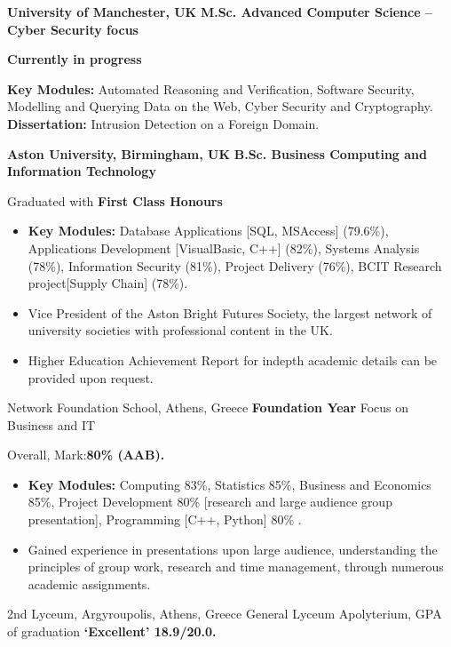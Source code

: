 {\textbf{University of Manchester, UK}}
{\textbf{M.Sc. Advanced Computer Science -- Cyber Security focus}}
{
    \textbf{Currently in progress}

    \textbf{Key Modules:} Automated Reasoning and Verification, Software Security, Modelling and Querying Data on the Web, Cyber Security and Cryptography.
    \\\textbf{Dissertation:} Intrusion Detection on a Foreign Domain.
}

{\textbf{Aston University, Birmingham, UK}}
{\textbf{B.Sc. Business Computing and Information Technology}}
{
    Graduated with \textbf{First Class Honours }
    \begin{itemize}
        \item \textbf{Key Modules:} Database Applications [SQL, MSAccess] (79.6\%), Applications Development [VisualBasic, C++] (82\%), Systems Analysis (78\%), Information Security (81\%), Project Delivery (76\%), BCIT Research project[Supply Chain]  (78\%).
        \item Vice President of the Aston Bright Futures Society, the largest network of university societies with professional content in the UK.
        \item Higher Education Achievement Report for indepth academic details can be provided upon request.
    \end{itemize}
}

{Network Foundation School, Athens, Greece}
{\textbf{Foundation Year} Focus on Business and IT}
{
    Overall, Mark:\textbf{80\% (AAB).}
    \begin{itemize}
        \item \textbf{Key Modules:} Computing 83\%, Statistics 85\%, Business and Economics 85\%, Project Development 80\% [research and large audience group presentation], Programming [C++, Python] 80\% .
        \item Gained experience in presentations upon large audience, understanding the principles of group work, research and time management, through numerous academic assignments.
    \end{itemize}
}

{}
{2nd Lyceum, Argyroupolis, Athens, Greece}
{General Lyceum Apolyterium, GPA of graduation \textbf{‘Excellent’ 18.9/20.0.}}
